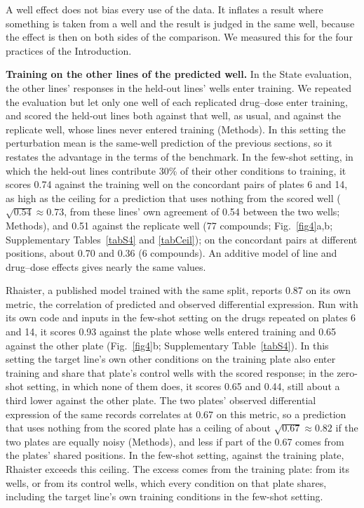 \documentclass[pdflatex,sn-nature]{sn-jnl}
\begin{document}
A well effect does not bias every use of the data. It inflates a result where something is taken from a well and the result is judged in the same well, because the effect is then on both sides of the comparison. We measured this for the four practices of the Introduction.

\textbf{Training on the other lines of the predicted well.} In the State evaluation, the other lines' responses in the held-out lines' wells enter training. We repeated the evaluation but let only one well of each replicated drug--dose enter training, and scored the held-out lines both against that well, as usual, and against the replicate well, whose lines never entered training (Methods). In this setting the perturbation mean is the same-well prediction of the previous sections, so it restates the advantage in the terms of the benchmark. In the few-shot setting, in which the held-out lines contribute 30\% of their other conditions to training, it scores 0.74 against the training well on the concordant pairs of plates 6 and 14, as high as the ceiling for a prediction that uses nothing from the scored well ($\sqrt{0.54}\approx0.73$, from these lines' own agreement of 0.54 between the two wells; Methods), and 0.51 against the replicate well (77 compounds; Fig.~\ref{fig4}a,b; Supplementary Tables~\ref{tabS4} and \ref{tabCeil}); on the concordant pairs at different positions, about 0.70 and 0.36 (6 compounds). An additive model of line and drug--dose effects gives nearly the same values.

Rhaister, a published model trained with the same split, reports 0.87 on its own metric, the correlation of predicted and observed differential expression\cite{rhaister2026}. Run with its own code and inputs in the few-shot setting on the drugs repeated on plates 6 and 14, it scores 0.93 against the plate whose wells entered training and 0.65 against the other plate (Fig.~\ref{fig4}b; Supplementary Table~\ref{tabS4}). In this setting the target line's own other conditions on the training plate also enter training and share that plate's control wells with the scored response; in the zero-shot setting, in which none of them does, it scores 0.65 and 0.44, still about a third lower against the other plate. The two plates' observed differential expression of the same records correlates at 0.67 on this metric, so a prediction that uses nothing from the scored plate has a ceiling of about $\sqrt{0.67}\approx0.82$ if the two plates are equally noisy (Methods), and less if part of the 0.67 comes from the plates' shared positions. In the few-shot setting, against the training plate, Rhaister exceeds this ceiling. The excess comes from the training plate: from its wells, or from its control wells, which every condition on that plate shares, including the target line's own training conditions in the few-shot setting.
\end{document}
